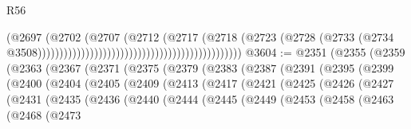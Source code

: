 \begin{lexlean}{R56}
\begin{coremodule}
                                                                              (@2697
                                                                                (@2702
                                                                                  (@2707
                                                                                    (@2712
                                                                                      (@2717
                                                                                        (@2718
                                                                                          (@2723
                                                                                            (@2728
                                                                                              (@2733
                                                                                                (@2734
                                                                                                  @3508)))))))))))))))))))))))))))))))))))))))))))))))
@3604 := @2351
    (@2355
      (@2359
        (@2363
          (@2367
            (@2371
              (@2375
                (@2379
                  (@2383
                    (@2387
                      (@2391
                        (@2395
                          (@2399
                            (@2400
                              (@2404
                                (@2405
                                  (@2409
                                    (@2413
                                      (@2417
                                        (@2421
                                          (@2425
                                            (@2426
                                              (@2427
                                                (@2431
                                                  (@2435
                                                    (@2436
                                                      (@2440
                                                        (@2444
                                                          (@2445
                                                            (@2449
                                                              (@2453
                                                                (@2458
                                                                  (@2463
                                                                    (@2468
                                                                      (@2473

\end{coremodule}
\end{lexlean}
